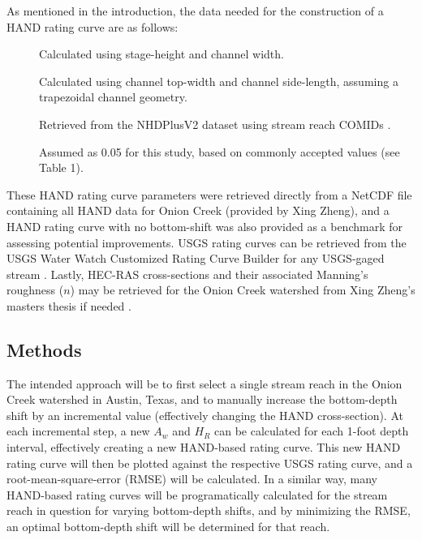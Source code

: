 \documentclass[11pt]{article}
\begin{document}
  As mentioned in the introduction, the data needed for the construction of a HAND rating curve are as follows: 

  \begin{description}
    \item[] Calculated using stage-height and channel width.
    \item[] Calculated using channel top-width and channel side-length, assuming a trapezoidal channel geometry. 
    \item[] Retrieved from the NHDPlusV2 dataset using stream reach COMIDs \cite{nhdplusv2}.
    \item[] Assumed as 0.05 for this study, based on commonly accepted values (see Table 1).
  \end{description}

  These HAND rating curve parameters were retrieved directly from a NetCDF file containing all HAND data for Onion Creek (provided by Xing Zheng), and a HAND rating curve with no bottom-shift was also provided as a benchmark for assessing potential improvements. USGS rating curves can be retrieved from the USGS Water Watch Customized Rating Curve Builder for any USGS-gaged stream \cite{usgswaterwatch}. Lastly, HEC-RAS cross-sections and their associated Manning's roughness ($n$) may be retrieved for the Onion Creek watershed from Xing Zheng's masters thesis if needed \cite{xingms}.

  \subsection*{Methods} %

  The intended approach will be to first select a single stream reach in the Onion Creek watershed in Austin, Texas, and to manually increase the bottom-depth shift by an incremental value (effectively changing the HAND cross-section). At each incremental step, a new $A_w$ and $H_R$ can be calculated for each 1-foot depth interval, effectively creating a new HAND-based rating curve. This new HAND rating curve will then be plotted against the respective USGS rating curve, and a root-mean-square-error (RMSE) will be calculated. In a similar way, many HAND-based rating curves will be programatically calculated for the stream reach in question for varying bottom-depth shifts, and by minimizing the RMSE, an optimal bottom-depth shift will be determined for that reach. 
\end{document}
